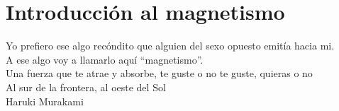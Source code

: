 
\chapter{Introducción al magnetismo} %


\newcommand{\keyword}[1]{\textbf{#1}}
\newcommand{\tabhead}[1]{\textbf{#1}}
\newcommand{\code}[1]{\texttt{#1}}
\newcommand{\file}[1]{\texttt{\bfseries#1}}
\newcommand{\option}[1]{\texttt{\itshape#1}}
\newcommand{\grados}{$^{\circ}$}




\vspace{0.5cm} 

\begin{flushright}
Yo prefiero ese algo recóndito que alguien del sexo opuesto emitía hacia mi.\\
A ese algo voy a llamarlo aquí “magnetismo”.\\
Una fuerza que te atrae y absorbe, te guste o no te guste, quieras o no\\
Al sur de la frontera, al oeste del Sol\\
Haruki Murakami
\end{flushright}
\vspace{1.0cm} 


 

